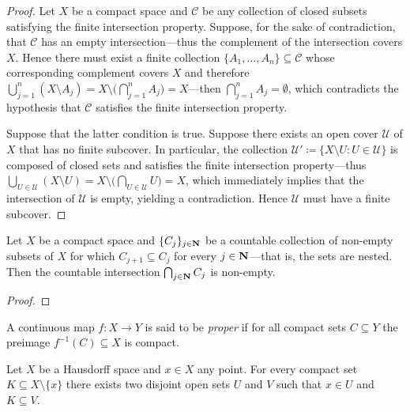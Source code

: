 \begin{proof}
Let \(X\) be a compact space and \(\mathcal{C}\) be any collection of closed
subsets satisfying the finite intersection property. Suppose, for the sake of
contradiction, that \(\mathcal{C}\) has an empty intersection---thus the
complement of the intersection covers \(X\). Hence there must exist a finite
collection \(\{A_1, \dots, A_n\} \subseteq \mathcal{C}\) whose corresponding
complement covers \(X\) and therefore
\(\bigcup_{j=1}^n (X \setminus A_j) = X \setminus \big( \bigcap_{j=1}^n A_j \big)
= X\)---then \(\bigcap_{j=1}^n A_j = \emptyset\), which contradicts the
hypothesis that \(\mathcal{C}\) satisfies the finite intersection property.

Suppose that the latter condition is true. Suppose there exists an open cover
\(\mathcal{U}\) of \(X\) that has no finite subcover. In particular, the
collection \(\mathcal{U}' \coloneq \{X \setminus U : U \in \mathcal{U}\}\) is
composed of closed sets and satisfies the finite intersection property---thus
\(\bigcup_{U \in \mathcal{U}} (X \setminus U) = X \setminus \big( \bigcap_{U \in
  \mathcal{U}} U \big) = X\), which immediately implies that the intersection of
\(\mathcal{U}\) is empty, yielding a contradiction. Hence \(\mathcal{U}\) must
have a finite subcover.
\end{proof}

\begin{lemma}
\label{lem:cpct-countable-intersection-nested-non-empty}
Let \(X\) be a compact space and \(\{C_j\}_{j \in \mathbf{N}}\) be a countable
collection of non-empty subsets of \(X\) for which \(C_{j+1} \subseteq C_j\) for
every \(j \in \mathbf{N}\)---that is, the sets are nested. Then the countable
intersection \(\bigcap_{j \in \mathbf{N}} C_j\) is non-empty.
\end{lemma}

\begin{proof}
\end{proof}

\begin{definition}
\label{def:proper-Top}
A continuous map \(f: X \to Y\) is said to be \emph{proper} if for all compact
sets \(C \subseteq Y\) the preimage \(f^{-1}(C) \subseteq X\) is compact.
\end{definition}

\begin{theorem}
\label{thm:hausdorff-compact-set-disjoint-neighbourhoods}
Let \(X\) be a Hausdorff space and \(x \in X\) any point. For every compact set
\(K \subseteq X \setminus \{x\}\) there exists two disjoint open sets \(U\) and
\(V\) such that \(x \in U\) and \(K \subseteq V\).
\end{theorem}

